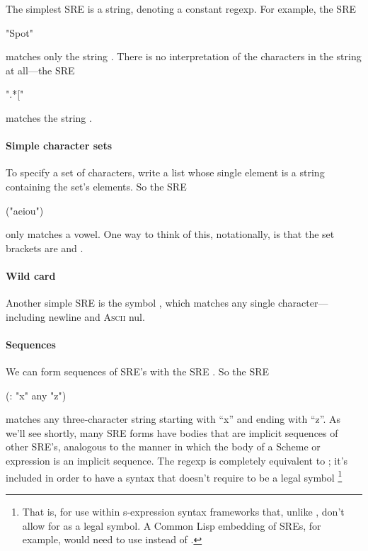 The simplest SRE is a string, denoting a constant regexp. For example, the SRE
\begin{code}
    "Spot"\end{code}
%
matches only the string 
. 
There is no interpretation of the characters in the string at all---the SRE
\begin{code}
    ".*["\end{code}
%
matches the string .


\paragraph{Simple character sets}

To specify a set of characters, write a list whose single element is
a string containing the set's elements. So the SRE
\begin{code}
    ("aeiou")\end{code}
%
only matches a vowel. One way to think of this, notationally, is that the
set brackets are  and .


\paragraph{Wild card}

Another simple SRE is the symbol , 
which matches any single character---including newline and \textsc{Ascii} nul.


\paragraph{Sequences}

We can form sequences of SRE's with the SRE .
So the SRE
\begin{code}
    (: "x" any "z")\end{code}
%
matches any three-character string starting with ``x'' and ending with ``z''.
As we'll see shortly, many SRE forms have bodies that are implicit sequences of
other SRE's, analogous to the manner in which the body of a Scheme 
 or  expression is an implicit  sequence. 
The regexp  is
completely equivalent to ; 
it's included in order to have a syntax that doesn't require 
\ex{:} to be a legal symbol \footnote{That is, for use within s-expression
syntax frameworks that, unlike \RnRS, don't allow for \ex{:} as a legal symbol. 
A Common Lisp embedding of SREs, for example, would need to use 
 instead of \ex{:}.}


